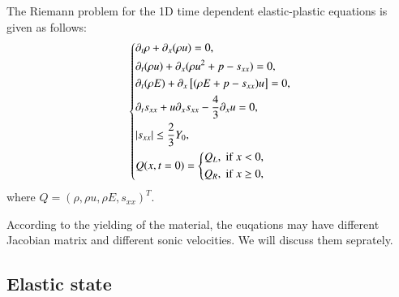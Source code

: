 \documentclass[review]{elsarticle}
\begin{document}
The Riemann problem for the 1D time dependent elastic-plastic equations is given as follows:
 \begin{equation}\label{eq:1d}
   \left\{ \begin{aligned}
       & \partial _t \rho +\partial_x(\rho u)=0,\\
       & \partial _t (\rho u)+\partial_x(\rho u^2 + p -s_{xx})=0,\\
       &\partial _t (\rho E)+\partial_x\left[(\rho E + p -s_{xx})u\right]=0,\\
       &\partial _t s_{xx}+u\partial_xs_{xx}-\frac{4}{3}\partial_x u=0,\\
& |s_{xx}|\leq \frac{2}{3}Y_{0}, \\
       &Q(x,t = 0) = \left\{\begin{aligned}
           Q_L, \hspace{0.1cm} \text{if} \hspace{0.1cm} x<0, \\
           Q_R, \hspace{0.1cm} \text{if} \hspace{0.1cm} x\ge 0, \\
       \end{aligned}\right.
     \end{aligned}
  \right.
\end{equation}
where $Q = (\rho, \rho u, \rho E, s_{xx})^T$.

According to the yielding of the material, the euqations may have different Jacobian matrix and different sonic velocities. We will discuss them seprately.
\subsection{Elastic state}
\end{document}
